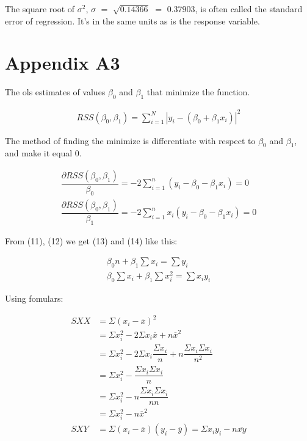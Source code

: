 \documentclass{article}
\begin{document}
    The square root of $\sigma ^ 2$, $\sigma$ $=$ $\sqrt{0.14366}$ $=$ $0.37903$, is often called the standard error of regression. It's in the same units as is the response variable.
    
\section{Appendix A3} 
    The ols estimates of values ${\beta_{0}}$ and ${\beta_{1}}$ that minimize the function.
    
    \begin{align}
        RSS(\beta_{0}, \beta_{1}) = \displaystyle \sum _{i = 1} ^ {N}   |y_{i} - (\beta_{0} + \beta_{1} x_{i})| ^ 2
    \end{align}
    
    The method of finding the minimize is differentiate with respect to $\beta_{0}$ and $\beta_{1}$, and make it equal $0$. 
    
    \begin{align} 
        \dfrac{\partial RSS(\beta_{0}, \beta_{1}) }{\beta_{0}} = -2 \displaystyle \sum _{i=1}^{n}  (y_{i} - \beta_{0} - \beta_{1} x_{i}) = 0
        \\
        \dfrac{\partial RSS(\beta_{0}, \beta_{1}) }{\beta_{1}} = -2 \displaystyle \sum _{i=1}^{n}  x_{i} (y_{i} - \beta_{0} - \beta_{1} x_{i}) = 0
    \end{align}
        
    From (11), (12) we get (13) and (14) like this: 
    
    \begin{align} 
        \beta_{0} n + \beta_{1} \displaystyle \sum x_{i} = \displaystyle \sum y_{i}
        \\
        \beta_{0} \displaystyle \sum x_{i} + \beta_{1} \displaystyle \sum x_{i}^2 = \displaystyle \sum x_{i} y_{i}
    \end{align}
    
    Using fomulars: 
    
     \begin{align} 
        SXX &= \Sigma (x_{i} - \overline{x})^2 \\
        &= \Sigma x_{i}^2 - 2 \Sigma x_{i} \overline{x} + n\overline{x}^2  \nonumber \\
        &= \Sigma x_{i}^2 - 2 \Sigma x_{i} \dfrac{\Sigma x_{i}}{n} + n\dfrac{\Sigma x_{i} \Sigma x_{i}}{n^2}   \nonumber \\
        &= \Sigma x_{i}^2 - \dfrac{\Sigma x_{i} \Sigma x_{i}}{n} \nonumber \\
        &= \Sigma x_{i}^2 - n\dfrac{\Sigma x_{i} \Sigma x_{i}}{n n} \nonumber \\
        &= \Sigma x_{i}^2 - n\overline{x}^2 \nonumber \\
        SXY &= \Sigma (x_{i} - \overline{x})(y_{i} - \overline{y}) = \Sigma x_{i}y_{i} - n\overline{xy}
    \end{align}
    
\end{document}
